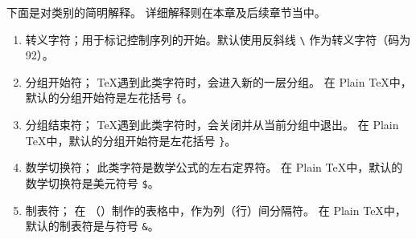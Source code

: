 \documentclass{book}
\begin{document}
下面是对类别的简明解释。
详细解释则在本章及后续章节当中。
\begin{enumerate}
\setcounter{enumi}{-1}
\item\label{ini:esc}
        转义字符；用于标记控制序列的开始。\IniTeX 默认使用反斜线 \verb-\- 作为转义字符（\ascii 码为 92）。
\item{}分组开始符；
        \TeX 遇到此类字符时，会进入新的一层分组。
        在 Plain \TeX 中，默认的分组开始符是左花括号 \verb-{-。
\item{}分组结束符；
        \TeX 遇到此类字符时，会关闭并从当前分组中退出。
        在 Plain \TeX 中，默认的分组开始符是左花括号 \verb-}-。
\item{}数学切换符；
        此类字符是数学公式的左右定界符。
        在 Plain \TeX 中，默认的数学切换符是美元符号 \verb-$-。
\item{}制表符；
        在 （）制作的表格中，作为列（行）间分隔符。
        在 Plain \TeX 中，默认的制表符是与符号 \verb-&-。

\end{enumerate}
\end{document}
